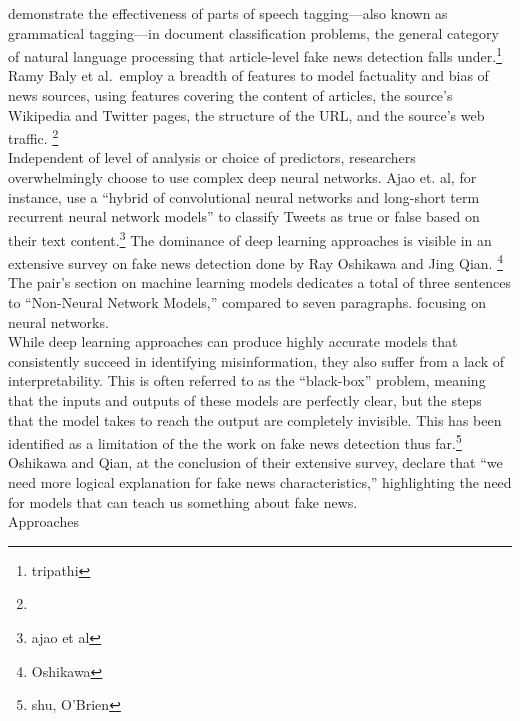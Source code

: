 \documentclass[12pt]{article}
\begin{document}
demonstrate the effectiveness of parts of speech tagging---also known as
grammatical tagging---in document classification problems, the general
category of natural language processing that article-level fake news
detection falls under.\footnote{tripathi} Ramy Baly et al.~employ a
breadth of features to model factuality and bias of news sources, using
features covering the content of articles, the source's Wikipedia and
Twitter pages, the structure of the URL, and the source's web traffic.
\footnote{}~\\
\hspace*{0.333em}\hspace*{0.333em}\hspace*{0.333em}\hspace*{0.333em}\hspace*{0.333em}Independent
of level of analysis or choice of predictors, researchers overwhelmingly
choose to use complex deep neural networks. Ajao et. al, for instance,
use a ``hybrid of convolutional neural networks and long-short term
recurrent neural network models'' to classify Tweets as true or false
based on their text content.\footnote{ajao et al} The dominance of deep
learning approaches is visible in an extensive survey on fake news
detection done by Ray Oshikawa and Jing Qian. \footnote{Oshikawa} The
pair's section on machine learning models dedicates a total of three
sentences to ``Non-Neural Network Models,'' compared to seven
paragraphs. focusing on neural networks.\\
\hspace*{0.333em}\hspace*{0.333em}\hspace*{0.333em}\hspace*{0.333em}\hspace*{0.333em}While
deep learning approaches can produce highly accurate models that
consistently succeed in identifying misinformation, they also suffer
from a lack of interpretability. This is often referred to as the
``black-box'' problem, meaning that the inputs and outputs of these
models are perfectly clear, but the steps that the model takes to reach
the output are completely invisible. This has been identified as a
limitation of the the work on fake news detection thus far.\footnote{shu,
  O'Brien} Oshikawa and Qian, at the conclusion of their extensive
survey, declare that ``we need more logical explanation for fake news
characteristics,'' highlighting the need for models that can teach us
something about fake news.\\
\hspace*{0.333em}\hspace*{0.333em}\hspace*{0.333em}\hspace*{0.333em}\hspace*{0.333em}Approaches
\end{document}
